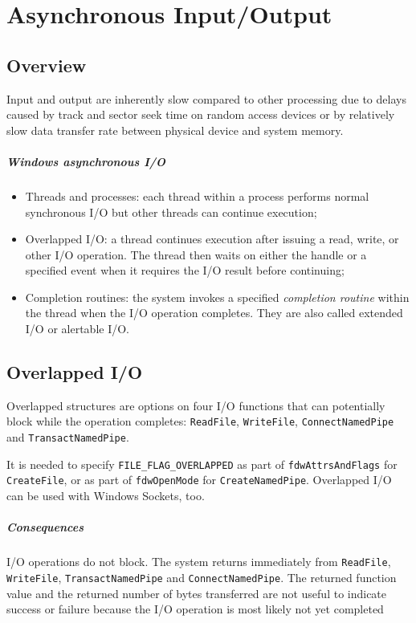 \chapter{Asynchronous Input/Output}
\section{Overview}
Input and output are inherently slow compared to other processing due to delays caused by track and sector seek time on random access devices or by relatively slow data transfer rate between physical device and system memory.

\paragraph{Windows asynchronous I/O}
\begin{itemize}
\item Threads and processes: each thread within a process performs normal synchronous I/O but other threads can continue execution;
\item Overlapped I/O: a thread continues execution after issuing a read, write, or other I/O operation. The thread then waits on either the handle or a specified event when it requires the I/O result before continuing;
\item Completion routines: the system invokes a specified \emph{completion routine} within the thread when the I/O operation completes. They are also called extended I/O or alertable I/O.
\end{itemize}

\section{Overlapped I/O}
Overlapped structures are options on four I/O functions that can potentially block while the operation completes: \texttt{ReadFile}, \texttt{WriteFile}, \texttt{ConnectNamedPipe} and \texttt{TransactNamedPipe}.

It is needed to specify \texttt{FILE\_FLAG\_OVERLAPPED} as part of \texttt{fdwAttrsAndFlags} for \texttt{CreateFile}, or as part of \texttt{fdwOpenMode} for \texttt{CreateNamedPipe}. Overlapped I/O can be used with Windows Sockets, too.

\paragraph{Consequences}
I/O operations do not block. The system returns immediately from \texttt{ReadFile}, \texttt{WriteFile}, \texttt{TransactNamedPipe} and \texttt{ConnectNamedPipe}. The returned function value and the returned number of bytes transferred are not useful to indicate success or failure because the I/O operation is most likely not yet completed

